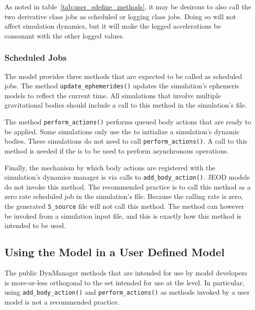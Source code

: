 As noted in table~\ref{tab:user_sdefine_methods}, it may be
desirous to also call the two derivative class jobs as scheduled or
logging class jobs. Doing so will not affect simulation dynamics, but it
will make the logged accelerations be consonant with the other logged values.


\subsubsection{Scheduled Jobs}\label{sec:user_integration_scheduled}
The model provides three methods that are expected to be called as
scheduled jobs. The method \verb+update_ephemerides()+ updates the
simulation's ephemeris models to reflect the current time. All simulations
that involve multiple gravitational bodies should include a call to
this method in the simulation's \Sdefine file.

The method \verb+perform_actions()+ performs queued body actions that
are ready to be applied. Some simulations only use the \BODYACTION
to initialize a simulation's dynamic bodies. These simulations do not
need to call \verb+perform_actions()+. A call to this method is needed
if the \BODYACTION is to be used to perform asynchronous operations.

Finally, the mechanism by which body actions are registered with the
simulation's dynamics manager is via calls to \verb+add_body_action()+.
JEOD models do not invoke this method. The recommended practice is to call this
method as a zero rate scheduled job in the simulation's \Sdefine file.
Because the calling rate is zero, the generated \verb+S_source+ file will not
call this method.
The method can however be invoked from a simulation input file,
and this is exactly how this method is intended to be used.

\subsection{Using the Model in a User Defined Model}
The public DynManager methods that are intended for use by model developers is
more-or-less orthogonal to the set intended for use at the \Sdefine level.
In particular, using \verb+add_body_action()+ and \verb+perform_actions()+ as
methods invoked by a user model is not a recommended practice.


